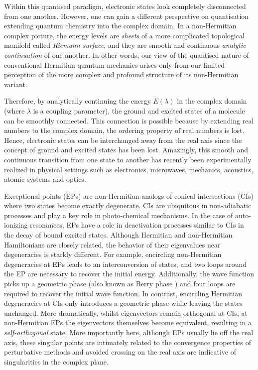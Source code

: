 \documentclass[11pt,a4paper]{article}
\begin{document}
Within this quantised paradigm, electronic states look completely disconnected from one another.
However, one can gain a different perspective on quantisation extending quantum chemistry into the complex domain.
In a non-Hermitian complex picture, the energy levels are \textit{sheets} of a more complicated topological manifold called \textit{Riemann surface}, and they are smooth and continuous \textit{analytic continuation} of one another.
In other words, our view of the quantised nature of conventional Hermitian quantum mechanics arises only from our limited perception of the more complex and profound structure of its non-Hermitian variant.

Therefore, by analytically continuing the energy $E(\lambda)$ in the complex domain (where $\lambda$ is a coupling parameter), the ground and excited states of a molecule can be smoothly connected.
This connection is possible because by extending real numbers to the complex domain, the ordering property of real numbers is lost.
Hence, electronic states can be interchanged away from the real axis since the concept of ground and excited states has been lost.
Amazingly, this smooth and continuous transition from one state to another has recently been experimentally realized in physical settings such as electronics, microwaves, mechanics, acoustics, atomic systems and optics. \cite{Bittner_2012, Chong_2011, Chtchelkatchev_2012, Doppler_2016, Guo_2009, Hang_2013, Liertzer_2012, Longhi_2010, Peng_2014, Peng_2014a, Regensburger_2012, Ruter_2010, Schindler_2011, Szameit_2011, Zhao_2010, Zheng_2013, Choi_2018, El-Ganainy_2018}


Exceptional points (EPs) \cite{Heiss_1990, Heiss_1999, Heiss_2012, Heiss_2016} are non-Hermitian analogs of conical intersections (CIs) \cite{Yarkony_1996} where two states become exactly degenerate.
CIs are ubiquitous in non-adiabatic processes and play a key role in photo-chemical mechanisms.
In the case of auto-ionizing resonances, EPs have a role in deactivation processes similar to CIs in the decay of bound excited states.
Although Hermitian and non-Hermitian Hamiltonians are closely related, the behavior of their eigenvalues near degeneracies is starkly different.
For example, encircling non-Hermitian degeneracies at EPs leads to an interconversion of states, and two loops around the EP are necessary to recover the initial energy.
Additionally, the wave function picks up a geometric phase (also known as Berry phase \cite{Berry_1984}) and four loops are required to recover the initial wave function.
In contrast, encircling Hermitian degeneracies at CIs only introduces a geometric phase while leaving the states unchanged.
More dramatically, whilst eigenvectors remain orthogonal at CIs, at non-Hermitian EPs the eigenvectors themselves become equivalent, resulting in a \textit{self-orthogonal} state. \cite{MoiseyevBook}
More importantly here, although EPs usually lie off the real axis, these singular points are intimately related to the convergence properties of perturbative methods and avoided crossing on the real axis are indicative of singularities in the complex plane. \cite{Olsen_1996, Olsen_2000} 
\end{document}
